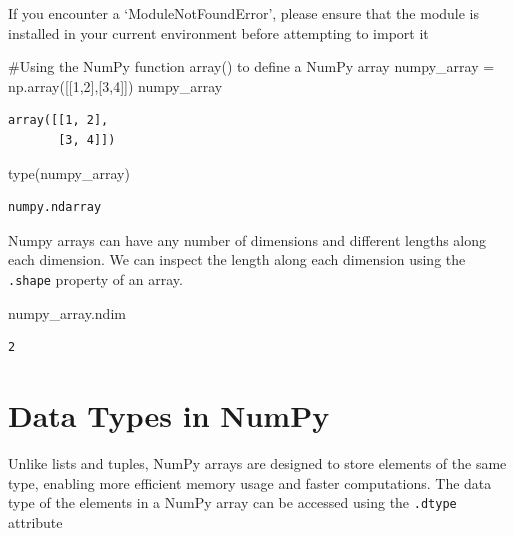 \documentclass[
  letterpaper,
  DIV=11,
  numbers=noendperiod]{scrreprt}
\newenvironment{Shaded}{\begin{snugshade}}{\end{snugshade}}
\newcommand{\BuiltInTok}[1]{\textcolor[rgb]{0.00,0.23,0.31}{#1}}
\newcommand{\CommentTok}[1]{\textcolor[rgb]{0.37,0.37,0.37}{#1}}
\newcommand{\DecValTok}[1]{\textcolor[rgb]{0.68,0.00,0.00}{#1}}
\newcommand{\NormalTok}[1]{\textcolor[rgb]{0.00,0.23,0.31}{#1}}
\newcommand{\OperatorTok}[1]{\textcolor[rgb]{0.37,0.37,0.37}{#1}}
\begin{document}
If you encounter a `ModuleNotFoundError', please ensure that the module
is installed in your current environment before attempting to import it

\begin{Shaded}
\begin{Highlighting}[]
\CommentTok{\#Using the NumPy function array() to define a NumPy array}
\NormalTok{numpy\_array }\OperatorTok{=}\NormalTok{ np.array([[}\DecValTok{1}\NormalTok{,}\DecValTok{2}\NormalTok{],[}\DecValTok{3}\NormalTok{,}\DecValTok{4}\NormalTok{]])}
\NormalTok{numpy\_array}
\end{Highlighting}
\end{Shaded}

\begin{verbatim}
array([[1, 2],
       [3, 4]])
\end{verbatim}

\begin{Shaded}
\begin{Highlighting}[]
\BuiltInTok{type}\NormalTok{(numpy\_array)}
\end{Highlighting}
\end{Shaded}

\begin{verbatim}
numpy.ndarray
\end{verbatim}

Numpy arrays can have any number of dimensions and different lengths
along each dimension. We can inspect the length along each dimension
using the \texttt{.shape} property of an array.

\begin{Shaded}
\begin{Highlighting}[]
\NormalTok{numpy\_array.ndim}
\end{Highlighting}
\end{Shaded}

\begin{verbatim}
2
\end{verbatim}

\hypertarget{data-types-in-numpy}{%
\section{Data Types in NumPy}\label{data-types-in-numpy}}

Unlike lists and tuples, NumPy arrays are designed to store elements of
the same type, enabling more efficient memory usage and faster
computations. The data type of the elements in a NumPy array can be
accessed using the \texttt{.dtype} attribute
\end{document}
